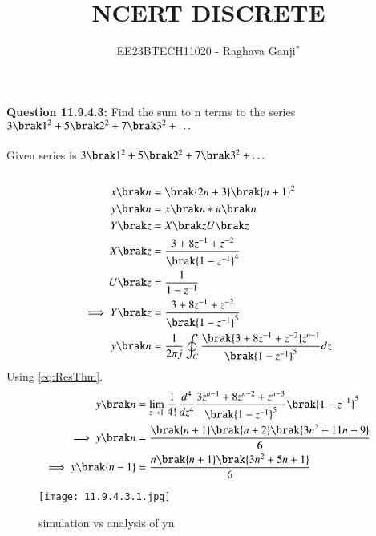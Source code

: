 \documentclass[journal,12pt,twocolumn]{IEEEtran}
\theoremstyle{remark}
\begin{document}

\vspace{3cm}

\title{NCERT DISCRETE}
\author{EE23BTECH11020 - Raghava Ganji$^{*}$%
}
\maketitle
\newpage
\bigskip

\renewcommand{\thefigure}{\theenumi}
\renewcommand{\thetable}{\theenumi}
\textbf{Question 11.9.4.3:}
Find the sum to n terms to the series $3\brak 1^2+5\brak 2^2+7\brak 3^2+ \ldots$\\ 
\solution\\
Given series is $3\brak 1^2+5\brak 2^2+7\brak 3^2+ \ldots$\\\\

\begin{align}
x\brak n&=\brak{2n+3}\brak{n+1}^2\\
y\brak n&=x\brak n*u\brak n\\
Y\brak z&=X\brak zU\brak z\\
X\brak z&=\frac{3+8z^{-1}+z^{-2}}{\brak{1-z^{-1}}^4}\\
U\brak z&=\frac{1}{1-z^{-1}}\\
\implies Y\brak z&=\frac{3+8z^{-1}+z^{-2}}{\brak{1-z^{-1}}^5}\\
y\brak n&=\frac{1}{2\pi j}\oint_C\frac{\brak{3+8z^{-1}+z^{-2}}z^{n-1}}{\brak{1-z^{-1}}^5}dz\\
\end{align}
Using \eqref{eq:ResThm}.
\begin{align}
y\brak n&=\lim_{z\to 1}\frac{1}{4!}\frac{d^4}{dz^4}\frac{3z^{n-1}+8z^{n-2}+z^{n-3}}{\brak{1-z^{-1}}^5}\brak {1-z^{-1}}^5\\
\implies y\brak n&=\frac{\brak{n+1}\brak{n+2}\brak{3n^2+11n+9}}{6}\\
\implies y\brak {n-1}&=\frac{n\brak{n+1}\brak{3n^2+5n+1}}{6}
\end{align}

\begin{figure}
    \centering
    \texttt{[image: 11.9.4.3.1.jpg]}
    \caption{simulation vs analysis of y\brak n}
\end{figure}
\end{document}
